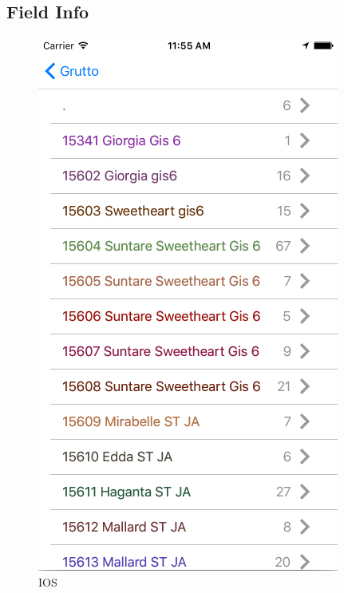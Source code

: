 \documentclass[12pt]{article}
\begin{document}
\subsection{Field Info}
\begin{figure}[ht]
	\centering
	\includegraphics[width=\linewidth, height=0.4\textheight, keepaspectratio=true, frame]{screenshots/RecordsIos.png}
	\caption{IOS}
	\endminipage\hfill
	\centering

\end{figure}
\end{document}
